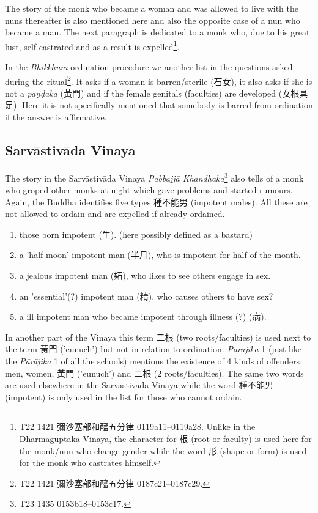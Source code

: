The story of the monk who became a woman and was allowed to live with the nuns thereafter is also mentioned here and also the opposite case of a nun who became a man. The next paragraph is dedicated to a monk who, due to his great lust, self-castrated and as a result is expelled\footnote{T22 1421 彌沙塞部和醯五分律 0119a11–0119a28. Unlike in the Dharmaguptaka Vinaya, the character for 根 (root or faculty) is used here for the monk/nun who change gender while the word 形 (shape or form) is used for the monk who castrates himself.}. 

In the {\em Bhikkhunī} ordination procedure we another list in the questions asked during the ritual\footnote{T22 1421 彌沙塞部和醯五分律 0187c21–0187c29.}. It asks if a woman is barren/sterile (石女), it also asks if she is not a {\em paṇḍaka} (黃門) and if the female genitals (faculties) are developed (女根具足). Here it is not specifically mentioned that somebody is barred from ordination if the answer is affirmative.

\subsection{Sarvāstivāda Vinaya}
The story in the Sarvāstivāda Vinaya {\em Pabbajjā Khandhaka}\footnote{T23 1435 0153b18–0153c17.} also tells of a monk who groped other monks at night which gave problems and started rumours. Again, the Buddha identifies five types 種不能男 (impotent males). All these are not allowed to ordain and are expelled if already ordained.

\begin{enumerate}
\item those born impotent (生). (here possibly defined as a bastard)
\item a 'half-moon' impotent man (半月), who is impotent for half of the month.
\item a jealous impotent man (妬), who likes to see others engage in sex.
\item an 'essential'(?) impotent man (精), who causes others to have sex?
\item a ill impotent man who became impotent through illness (?) (病).
\end{enumerate}

In another part of the Vinaya this term 二根 (two roots/faculties) is used next to the term 黃門 ('eunuch') but not in relation to ordination. {\em Pārājika} 1 (just like the {\em Pārājika} 1 of all the schools) mentions the existence of 4 kinds of offenders, men, women, 黃門 ('eunuch') and 二根 (2 roots/faculties). The same two words are used elsewhere in the Sarvāstivāda Vinaya while the word 種不能男 (impotent) is only used in the list for those who cannot ordain.

